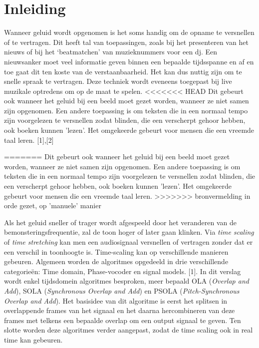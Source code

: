 \documentclass[12pt]{report}
\begin{document}
\tableofcontents

\chapter{Inleiding}

Wanneer geluid wordt opgenomen is het soms handig om de opname te versnellen of te vertragen. Dit heeft tal van toepassingen, zoals bij het presenteren van het nieuws of bij het ‘beatmatchen’ van muzieknummers voor een dj. Een nieuwsanker moet veel informatie geven binnen een bepaalde tijdsspanne en af en toe gaat dit ten koste van de verstaanbaarheid. Het kan dus nuttig zijn om te snelle spraak te vertragen. Deze techniek wordt eveneens toegepast bij live muzikale optredens om op de maat te spelen.
<<<<<<< HEAD
Dit gebeurt ook wanneer het geluid bij een beeld moet gezet worden, wanneer ze niet samen zijn opgenomen. Een andere toepassing is om teksten die in een normaal tempo zijn voorgelezen te versnellen zodat blinden, die een verscherpt gehoor hebben, ook boeken kunnen 'lezen'. Het omgekeerde gebeurt voor mensen die een vreemde taal leren. [1],[2]
\cite{Thesis}
 
=======
Dit gebeurt ook wanneer het geluid bij een beeld moet gezet worden, wanneer ze niet samen zijn opgenomen. Een andere toepassing is om teksten die in een normaal tempo zijn voorgelezen te versnellen zodat blinden, die een verscherpt gehoor hebben, ook boeken kunnen 'lezen'. Het omgekeerde gebeurt voor mensen die een vreemde taal leren.
\cite{Thesis, surina}
>>>>>>> bronvermelding in orde gezet, op 'manuele' manier

Als het geluid sneller of trager wordt afgespeeld door het veranderen van de bemonsteringsfrequentie, zal de toon hoger of later gaan klinken. Via \textit{time scaling} of \textit{time stretching} kan men een audiosignaal versnellen of vertragen zonder dat er een verschil in toonhoogte is. Time-scaling kan op verschillende manieren gebeuren. Algemeen worden de algoritmes opgedeeld in drie verschillende categorie\"{e}n: Time domain, Phase-vocoder en signal models. [1]. In dit verslag wordt enkel tijdsdomein algoritmes besproken, meer bepaald OLA (\textit{Overlap and Add}), SOLA (\textit{Synchronous Overlap and Add}) en PSOLA (\textit{Pitch-Synchronous Overlap and Add}). Het basisidee  van dit algoritme is eerst het splitsen in overlappende frames van het signaal en het daarna hercombineren van deze frames met telkens een bepaalde overlap om een output signaal te geven. Ten slotte worden deze algoritmes verder aangepast, zodat de time scaling ook in real time kan gebeuren.
\end{document}
